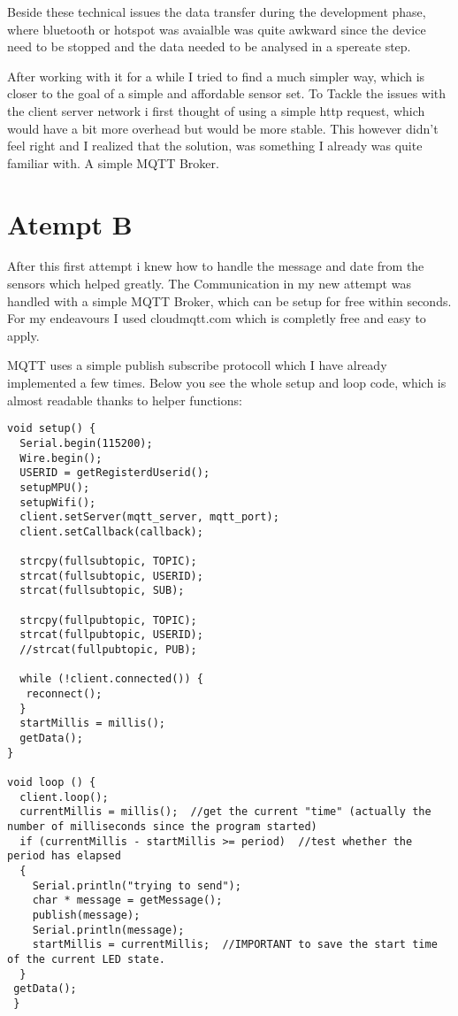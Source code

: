 Beside these technical issues the data transfer during the development phase, where bluetooth or hotspot was avaialble was quite awkward since the device need to be stopped and the data needed to be analysed in a spereate step. 

After working with it for a while I tried to find a much simpler way, which is closer to the goal of a simple and affordable sensor set. To Tackle the issues with the client server network i first thought of using a simple http request, which would have a bit more overhead but would be more stable. This however didn't feel right and I realized that the solution, was something I already was quite familiar with. A simple MQTT Broker. 

\section{Atempt B}

After this first attempt i knew how to handle the message and date from the sensors which helped greatly. 
The Communication in my new attempt was handled with a simple MQTT Broker, which can be setup for free within seconds. For my endeavours I used cloudmqtt.com which is completly free and easy to apply. 

MQTT uses a simple publish subscribe protocoll which I have already implemented a few times.
Below you see the whole setup and loop code, which is almost readable thanks to helper functions:
\begin{lstlisting}
void setup() {
  Serial.begin(115200);
  Wire.begin();
  USERID = getRegisterdUserid();
  setupMPU();
  setupWifi();
  client.setServer(mqtt_server, mqtt_port);
  client.setCallback(callback);

  strcpy(fullsubtopic, TOPIC); 
  strcat(fullsubtopic, USERID);
  strcat(fullsubtopic, SUB);
  
  strcpy(fullpubtopic, TOPIC); 
  strcat(fullpubtopic, USERID);
  //strcat(fullpubtopic, PUB);
  
  while (!client.connected()) {
   reconnect();
  }
  startMillis = millis(); 
  getData();
}

void loop () {
  client.loop();
  currentMillis = millis();  //get the current "time" (actually the number of milliseconds since the program started)
  if (currentMillis - startMillis >= period)  //test whether the period has elapsed
  {
    Serial.println("trying to send");
    char * message = getMessage();
    publish(message);
    Serial.println(message);
    startMillis = currentMillis;  //IMPORTANT to save the start time of the current LED state.
  }
 getData();
 }
\end{lstlisting}

